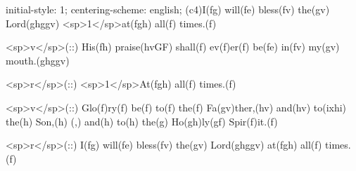 initial-style: 1;
centering-scheme: english;
(c4)I(fg) will(fe) bless(fv) the(gv) Lord(ghggv) <sp>1</sp>at(fgh) all(f) times.(f)

<sp>v</sp>(::) His(fh) praise(hvGF) shall(f) ev(f)er(f) be(fe) in(fv) my(gv) mouth.(ghggv)

<sp>r</sp>(::) <sp>1</sp>At(fgh) all(f) times.(f)

<sp>v</sp>(::) Glo(f)ry(f) be(f) to(f) the(f) Fa(gv)ther,(hv) and(hv) to(ixhi) the(h) Son,(h) (,) and(h) to(h) the(g) Ho(gh)ly(gf) Spir(f)it.(f)

<sp>r</sp>(::) I(fg) will(fe) bless(fv) the(gv) Lord(ghggv) at(fgh) all(f) times.(f)
